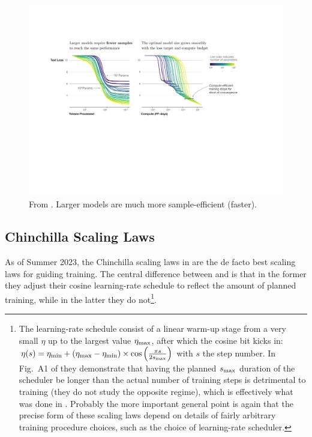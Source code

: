 \documentclass[11pt]{article}
\begin{document}
\begin{figure}[ht]
    \centering
    \includegraphics[scale=.5]{figures/EfficiencyIllustration.pdf}
    \caption{From \cite{kaplan2020scaling}. Larger models are much more sample-efficient (faster).}
    \label{fig_scaling_laws_original_2}
\end{figure}


\subsection{Chinchilla Scaling Laws}

As of Summer 2023, the Chinchilla scaling laws in \cite{hoffmann2022training} are the de facto best
scaling laws for guiding training. The central difference between \cite{hoffmann2022training} and
\cite{kaplan2020scaling} is that in the former they adjust their cosine learning-rate schedule to
reflect the amount of planned training, while in the latter they do not\footnote{The learning-rate
schedule consist of a linear warm-up stage from a very small $ \eta  $ up to the largest value $ \eta _{ {\rm max} } $, after
which the cosine bit kicks in: $ \eta (s)= \eta _{ {\rm min} } + \left ( \eta _{ {\rm max} } - \eta  _{ {\rm
min} } \right ) \times \cos \left (\frac{ \pi s }{ 2 s _{ {\rm max} } }  \right) $ with $ s $ the
step number. In Fig.~A1 of \cite{hoffmann2022training} they demonstrate that having the planned $ s
_{ {\rm max} } $ duration of the scheduler be longer than the actual number of training steps is
detrimental to training (they do not study the opposite regime), which is effectively what was done
in \cite{kaplan2020scaling}. Probably the more important general point is again that the precise
form of these scaling laws depend on details of fairly arbitrary training procedure choices, such as
the choice of learning-rate scheduler.}.
\end{document}
